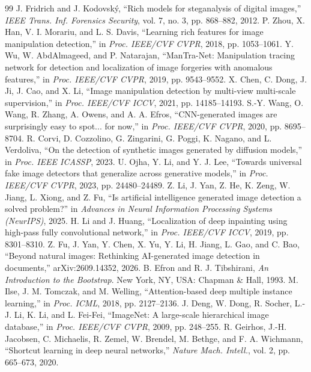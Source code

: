 \documentclass[conference]{IEEEtran}
\begin{document}
\begin{thebibliography}{99}
 J. Fridrich and J. Kodovsk\'y, ``Rich models for steganalysis of digital images,'' \emph{IEEE Trans. Inf. Forensics Security}, vol. 7, no. 3, pp. 868--882, 2012.
 P. Zhou, X. Han, V. I. Morariu, and L. S. Davis, ``Learning rich features for image manipulation detection,'' in \emph{Proc. IEEE/CVF CVPR}, 2018, pp. 1053--1061.
 Y. Wu, W. AbdAlmageed, and P. Natarajan, ``ManTra-Net: Manipulation tracing network for detection and localization of image forgeries with anomalous features,'' in \emph{Proc. IEEE/CVF CVPR}, 2019, pp. 9543--9552.
 X. Chen, C. Dong, J. Ji, J. Cao, and X. Li, ``Image manipulation detection by multi-view multi-scale supervision,'' in \emph{Proc. IEEE/CVF ICCV}, 2021, pp. 14185--14193.
 S.-Y. Wang, O. Wang, R. Zhang, A. Owens, and A. A. Efros, ``CNN-generated images are surprisingly easy to spot... for now,'' in \emph{Proc. IEEE/CVF CVPR}, 2020, pp. 8695--8704.
 R. Corvi, D. Cozzolino, G. Zingarini, G. Poggi, K. Nagano, and L. Verdoliva, ``On the detection of synthetic images generated by diffusion models,'' in \emph{Proc. IEEE ICASSP}, 2023.
 U. Ojha, Y. Li, and Y. J. Lee, ``Towards universal fake image detectors that generalize across generative models,'' in \emph{Proc. IEEE/CVF CVPR}, 2023, pp. 24480--24489.
 Z. Li, J. Yan, Z. He, K. Zeng, W. Jiang, L. Xiong, and Z. Fu, ``Is artificial intelligence generated image detection a solved problem?'' in \emph{Advances in Neural Information Processing Systems (NeurIPS)}, 2025.
 H. Li and J. Huang, ``Localization of deep inpainting using high-pass fully convolutional network,'' in \emph{Proc. IEEE/CVF ICCV}, 2019, pp. 8301--8310.
 Z. Fu, J. Yan, Y. Chen, X. Yu, Y. Li, H. Jiang, L. Gao, and C. Bao, ``Beyond natural images: Rethinking AI-generated image detection in documents,'' arXiv:2609.14352, 2026.
 B. Efron and R. J. Tibshirani, \emph{An Introduction to the Bootstrap}. New York, NY, USA: Chapman \& Hall, 1993.
 M. Ilse, J. M. Tomczak, and M. Welling, ``Attention-based deep multiple instance learning,'' in \emph{Proc. ICML}, 2018, pp. 2127--2136.
 J. Deng, W. Dong, R. Socher, L.-J. Li, K. Li, and L. Fei-Fei, ``ImageNet: A large-scale hierarchical image database,'' in \emph{Proc. IEEE/CVF CVPR}, 2009, pp. 248--255.
 R. Geirhos, J.-H. Jacobsen, C. Michaelis, R. Zemel, W. Brendel, M. Bethge, and F. A. Wichmann, ``Shortcut learning in deep neural networks,'' \emph{Nature Mach. Intell.}, vol. 2, pp. 665--673, 2020.

\end{thebibliography}
\end{document}
